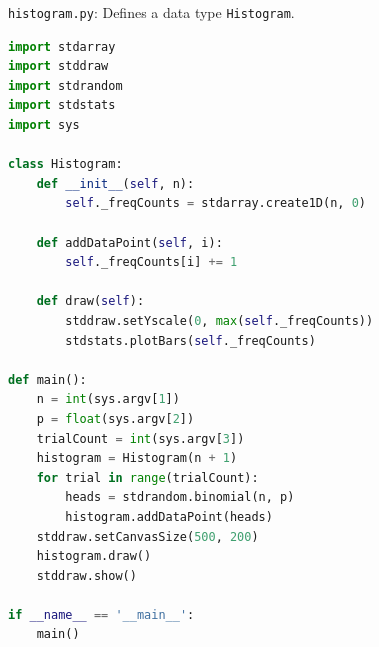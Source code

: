 \documentclass[8pt,a4paper,compress,handout]{beamer}
\begin{document}
\begin{frame}[fragile]
\begin{framed}
\tiny \lstinline{histogram.py}: Defines a data type \lstinline{Histogram}.
\end{framed}

\begin{lstlisting}[language=Python]
import stdarray
import stddraw
import stdrandom
import stdstats
import sys

class Histogram:
    def __init__(self, n):
        self._freqCounts = stdarray.create1D(n, 0)

    def addDataPoint(self, i):
        self._freqCounts[i] += 1

    def draw(self):
        stddraw.setYscale(0, max(self._freqCounts))
        stdstats.plotBars(self._freqCounts)

def main():
    n = int(sys.argv[1]) 
    p = float(sys.argv[2])
    trialCount = int(sys.argv[3]) 
    histogram = Histogram(n + 1)
    for trial in range(trialCount):
        heads = stdrandom.binomial(n, p)
        histogram.addDataPoint(heads)
    stddraw.setCanvasSize(500, 200)
    histogram.draw()
    stddraw.show()

if __name__ == '__main__':
    main()
\end{lstlisting}
\end{frame}
\end{document}
